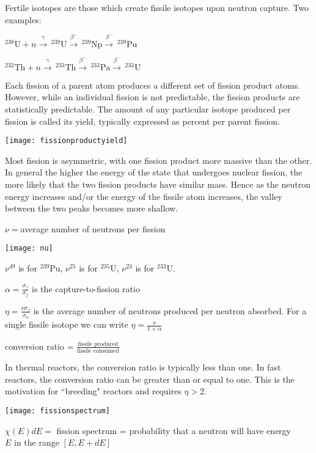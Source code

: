 \documentclass[12pt]{article}
\begin{document}
Fertile isotopes are those which create fissile isotopes upon neutron capture. Two examples:

$^{238}\text{U}+n \stackrel{\gamma}{\rightarrow} \, ^{239}\text{U}\stackrel{\beta^-}{\rightarrow} \, ^{239}\text{Np}\stackrel{\beta^-}{\rightarrow} \, ^{239}\text{Pu}$

$^{232}\text{Th}+n \stackrel{\gamma}{\rightarrow} \,^{233}\text{Th}\stackrel{\beta^-}{\rightarrow}\, ^{233}\text{Pa}\stackrel{\beta^-}{\rightarrow} \, ^{233}\text{U}$

Each fission of a parent atom produces a different set of fission product atoms. However, while an individual fission is not predictable, the fission products are statistically predictable. The amount of any particular isotope produced per fission is called its yield, typically expressed as percent per parent fission.
\begin{center}
\texttt{[image: fissionproductyield]}
\end{center}

Most fission is asymmetric, with one fission product more massive than the other. In general the higher the energy of the state that undergoes nuclear fission, the more likely that the two fission products have similar mass. Hence as the neutron energy increases and/or the energy of the fissile atom increases, the valley between the two peaks becomes more shallow.

$\nu=$average number of neutrons per fission
\begin{center}
\texttt{[image: nu]}
\end{center}
$\nu^{49}$ is for $^{239}$Pu, $\nu^{25}$ is for $^{235}$U, $\nu^{23}$ is for $^{233}$U.


$\alpha = \frac{\sigma_\gamma}{\sigma_f}$ is the capture-to-fission ratio

$\eta = \frac{\nu \sigma_f}{\sigma_a}$ is the average number of neutrons produced per neutron absorbed. For a single fissile isotope we can write $\eta = \frac{\nu}{1+\alpha}$

conversion ratio = $\frac{\text{fissile produced}}{\text{fissile consumed}}$

In thermal reactors, the conversion ratio is typically less than one. In fast reactors, the conversion ratio can be greater than or equal to one. This is the motivation for ``breeding" reactors and requires $\eta >2$.

\begin{center}
\texttt{[image: fissionspectrum]}
\end{center}
$\chi(E)dE=$ fission spectrum = probability that a neutron will have energy\\ $E$ in the range $[E, E+dE]$
\end{document}
